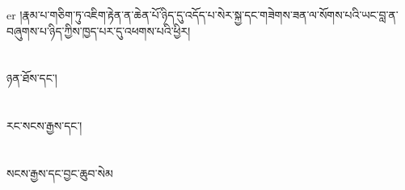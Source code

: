 er{ }།རྣམ་པ་གཅིག་ཏུ་འཇིག་རྟེན་ན་ཆེན་པོ་ཉིད་དུ་འདོད་པ་སེར་སྐྱ་དང་གཟེགས་ཟན་ལ་སོགས་པའི་ཡང་བླ་ན་བཞུགས་པ་ཉིད་ཀྱིས་ཁྱད་པར་དུ་འཕགས་པའི་ཕྱིར།\chapter{ }ཉན་ཐོས་དང་།\chapter{ }རང་སངས་རྒྱས་དང་།\chapter{ }སངས་རྒྱས་དང་བྱང་ཆུབ་སེམ